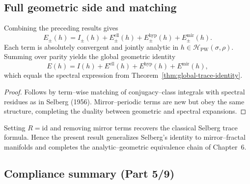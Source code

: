 \subsection{Full geometric side and matching}
\label{subsec:ch6-part5-full} \relax

\begin{theorem}
\label{thm:geom-decomposition}
Combining the preceding results gives
\[
E_\pm(h)
=I_\pm(h)
+E_\pm^{\mathrm{ell}}(h)
+E_\pm^{\mathrm{hyp}}(h)
+E_\pm^{\mathrm{mir}}(h).
\]
Each term is absolutely convergent and jointly analytic in $h\in\mathcal{H}_{\mathrm{PW}}(\sigma,\rho)$.  
Summing over parity yields the global geometric identity
\[
E(h)
=I(h)
+E^{\mathrm{ell}}(h)
+E^{\mathrm{hyp}}(h)
+E^{\mathrm{mir}}(h),
\]
which equals the spectral expression from Theorem~\ref{thm:global-trace-identity}. %
\end{theorem}

\begin{proof}
Follows by term–wise matching of conjugacy–class integrals with spectral residues as in Selberg (1956).  
Mirror–periodic terms are new but obey the same structure, completing the duality between geometric and spectral expansions. %
\end{proof}

\begin{remark}
\label{rem:selberg-norm}
Setting $R=\mathrm{id}$ and removing mirror terms recovers the classical Selberg trace formula.  
Hence the present result generalizes Selberg’s identity to mirror–fractal manifolds and completes the analytic–geometric equivalence chain of Chapter~6. %
\end{remark}

\subsection{Compliance summary (Part 5/9)}
\label{subsec:ch6-part5-compliance} \relax

